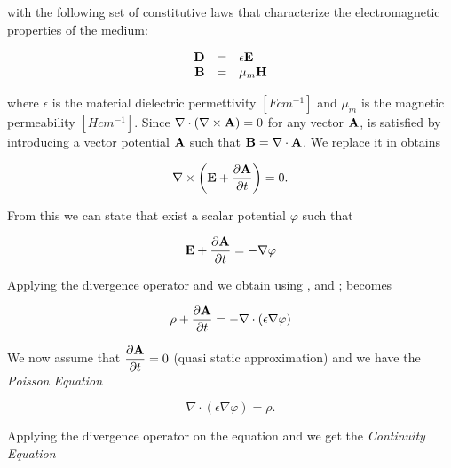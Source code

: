 with the following set of constitutive laws that characterize the electromagnetic properties of the medium:

\begin{equation}
\begin{array}{rcl}
\mathbf{D} & = & \epsilon \mathbf{E} \\
\mathbf{B} & = & \mu_m \mathbf{H} \label{eq: magnetic costitutive}
\end{array}
\end{equation}

where $\epsilon$ is the material dielectric permettivity $[F cm^{-1}]$ and $\mu_m$ is the magnetic permeability $[H cm^{-1}]$. Since $\nabla \cdot (\nabla \times \mathbf{A})=0$ for any vector $\mathbf{A}$,  is satisfied by introducing a vector potential $\mathbf{A}$ such that $\mathbf{B}= \nabla \cdot \mathbf{A}$. We replace it in  obtains

\begin{equation}
\nabla \times \left( \mathbf{E} + \dfrac{\partial \mathbf{A}}{\partial t} \right) = 0.
\end{equation}

From this we can state that exist a scalar potential $\varphi$ such that

\begin{equation}
\label{eq: potenziale scalare}
\mathbf{E} + \dfrac{\partial \mathbf{A}}{\partial t} = -\nabla \varphi
\end{equation}


 Applying the divergence operator and we obtain using ,  and ;   becomes

\begin{equation}
\rho + \dfrac{\partial \mathbf{A}}{\partial t}  = -\nabla \cdot (\epsilon \nabla \varphi)
\end{equation}

We now assume that $\dfrac{\partial \mathbf{A}}{\partial t} = 0$ (quasi static approximation) and we have the \textit{Poisson Equation}

\begin{equation}
\label{eq: Poisson equation}
\nabla \cdot (\epsilon \nabla \varphi) = \rho.
\end{equation} 
	
Applying the divergence operator on the equation   and we get the \textit{Continuity Equation}

